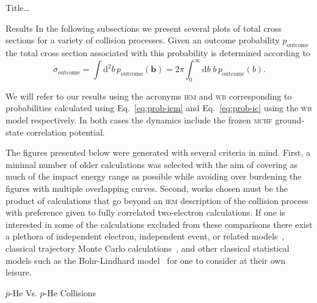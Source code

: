 \documentclass[letterpaper, 10 pt]{report}
\begin{document}
\begin{chapter}{ Title\dots \label{chap:p-he2p-he}}
\begin{section}{Results \label{sec:phe2p-res}}
      In the following subsections we present several plots of total cross sections for a variety of
      collision processes. Given an outcome probability $p_\mathrm{outcome}$ the total cross section
      associated with this probability is determined according to
      \begin{equation} \label{eq:tcs}
         \sigma_\mathrm{outcome} = \int \mathrm{d}^2 b \, p_\mathrm{outcome} (\mathbf{b})
         = 2 \pi \int^\infty_0 \mathrm{d}b \; b \, p_\mathrm{outcome} (b).
      \end{equation}
   
      We will refer to our results using the acronyms \textsc{iem} and \textsc{wb} corresponding to
      probabilities calculated using Eq.~\eqref{eq:prob-iem} and Eq.~\eqref{eq:prob-ic} using the
      \textsc{wb} model respectively. In both cases the dynamics include the frozen \textsc{mchf}
      ground-state correlation potential.

      The figures presented below were generated with several criteria in mind. First, a minimal number
      of older calculations was selected with the aim of covering as much of the impact energy range as
      possible while avoiding over burdening the figures with multiple overlapping curves. Second, works
      chosen must be the product of calculations that go beyond an \textsc{iem} description of the
      collision process with preference given to fully correlated two-electron calculations. If one is
      interested in some of the calculations excluded from these comparisons there exist a plethora of
      independent electron, independent event, or related models~\cite{SLD-83, DMR-84, SLD-85, GM-86,
      CM-87, GM-87, JLF-89, DC-90, DC-91a, DC-91b, DG-91, SKG-91, SL-91, Kuang-92, MLC-93, CM-94,
      CSR-95, BDM-96, MBGH-97, McCartney-97, Mccartney-99, GAMRF-02, GFS-02, AMRF-04, BLMC-04, FRBJG-06,
      FJG-07, GIFK-08, ZK-09, G-11, LFG-11, GG-12}, classical trajectory Monte Carlo
      calculations~\cite{ZM-85, OWM-86, MO-87, WO-88, MS-89, Cohen-96, TH-96, MMTH-02, DAKW-04, GEP-09},
      and other classical statistical models such as the Bohr-Lindhard model~\cite{DYC-08,Ding-12} for
      one to consider at their own leisure.

      \begin{subsection}{ \texorpdfstring{$\bar{p}$}{pbar}-He Vs. \texorpdfstring{$p$}{p}-He Collisions
                         \label{sec:pbarhe-res}}


\end{subsection}
\end{section}
\end{chapter}
\end{document}
